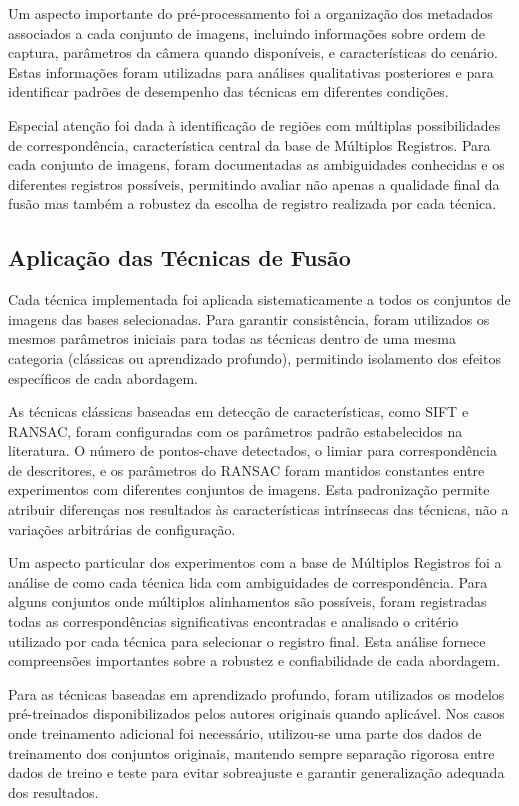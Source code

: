 Um aspecto importante do pré-processamento foi a organização dos metadados associados a cada conjunto de imagens, incluindo informações sobre ordem de captura, parâmetros da câmera quando disponíveis, e características do cenário. Estas informações foram utilizadas para análises qualitativas posteriores e para identificar padrões de desempenho das técnicas em diferentes condições.

Especial atenção foi dada à identificação de regiões com múltiplas possibilidades de correspondência, característica central da base de Múltiplos Registros. Para cada conjunto de imagens, foram documentadas as ambiguidades conhecidas e os diferentes registros possíveis, permitindo avaliar não apenas a qualidade final da fusão mas também a robustez da escolha de registro realizada por cada técnica.

\subsection{Aplicação das Técnicas de Fusão}

Cada técnica implementada foi aplicada sistematicamente a todos os conjuntos de imagens das bases selecionadas. Para garantir consistência, foram utilizados os mesmos parâmetros iniciais para todas as técnicas dentro de uma mesma categoria (clássicas ou aprendizado profundo), permitindo isolamento dos efeitos específicos de cada abordagem.

As técnicas clássicas baseadas em detecção de características, como SIFT e RANSAC, foram configuradas com os parâmetros padrão estabelecidos na literatura. O número de pontos-chave detectados, o limiar para correspondência de descritores, e os parâmetros do RANSAC foram mantidos constantes entre experimentos com diferentes conjuntos de imagens. Esta padronização permite atribuir diferenças nos resultados às características intrínsecas das técnicas, não a variações arbitrárias de configuração.

Um aspecto particular dos experimentos com a base de Múltiplos Registros foi a análise de como cada técnica lida com ambiguidades de correspondência. Para alguns conjuntos onde múltiplos alinhamentos são possíveis, foram registradas todas as correspondências significativas encontradas e analisado o critério utilizado por cada técnica para selecionar o registro final. Esta análise fornece compreensões importantes sobre a robustez e confiabilidade de cada abordagem.

Para as técnicas baseadas em aprendizado profundo, foram utilizados os modelos pré-treinados disponibilizados pelos autores originais quando aplicável. Nos casos onde treinamento adicional foi necessário, utilizou-se uma parte dos dados de treinamento dos conjuntos originais, mantendo sempre separação rigorosa entre dados de treino e teste para evitar sobreajuste e garantir generalização adequada dos resultados.

